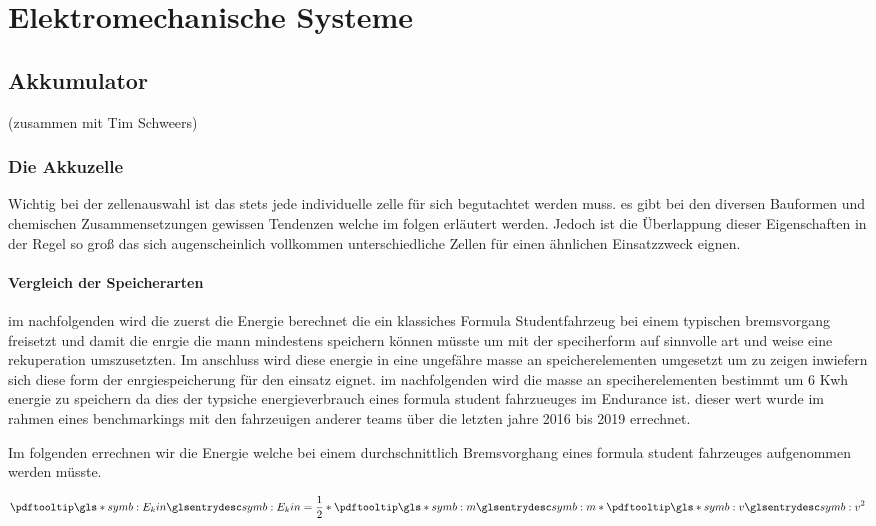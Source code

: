 
\chapter{Elektromechanische Systeme}

\section{Akkumulator} (zusammen mit Tim Schweers)

\subsection{Die Akkuzelle}

Wichtig bei der zellenauswahl ist das stets jede individuelle zelle für sich begutachtet werden muss. es gibt bei den diversen Bauformen und chemischen Zusammensetzungen gewissen Tendenzen welche im folgen erläutert werden. Jedoch ist die Überlappung dieser Eigenschaften in der Regel so groß das sich augenscheinlich vollkommen unterschiedliche Zellen für einen ähnlichen Einsatzzweck eignen.
\FloatBarrier
\subsubsection{Vergleich der Speicherarten}

im nachfolgenden wird die zuerst die Energie berechnet die ein klassiches Formula Studentfahrzeug bei einem typischen bremsvorgang freisetzt und damit die enrgie die mann mindestens speichern können müsste um mit der speciherform auf sinnvolle art und weise eine rekuperation umszusetzten. Im anschluss wird diese energie in eine ungefähre masse an speicherelementen umgesetzt um zu zeigen inwiefern sich diese form der enrgiespeicherung für den einsatz eignet. im nachfolgenden wird die masse an speciherelementen bestimmt um 6 Kwh energie zu speichern da dies der typsiche energieverbrauch eines formula student fahrzueuges im Endurance ist. dieser wert wurde im rahmen eines benchmarkings mit den fahrzeuigen anderer teams über die letzten jahre 2016 bis 2019 errechnet.

Im folgenden errechnen wir die Energie welche bei einem durchschnittlich Bremsvorghang eines formula student fahrzeuges aufgenommen werden müsste. 

\begin{equation}
\glsc{symb:E_kin} = \dfrac{1}{2} * \glsc{symb:m} * \glsc{symb:v}^2
\end{equation}

